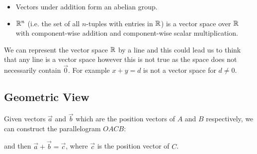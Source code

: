 \documentclass[../main.tex]{subfiles}
\begin{document}
\begin{remark}[Remarks]
  \begin{itemize}
    \item Vectors under addition form an abelian group.
    \item $\mathbb{R}^{n}$ (i.e. the set of all $n$-tuples with entries in $\mathbb{R}$) is a vector space over $\mathbb{R}$ with component-wise addition and component-wise scalar multiplication.
  \end{itemize}
\end{remark}
\begin{remark}[Warning]
  We can represent the vector space $\mathbb{R}$ by a line and this could lead us to think that any line is a vector space however this is not true as the space does not necessarily contain $\vec{0}$.
  For example $x + y = d$ is not a vector space for $d \neq 0$.
\end{remark}
\subsection{Geometric View}
Given vectors $\vec{a}$ and $\vec{b}$ which are the position vectors of $A$ and $B$ respectively, we can construct the parallelogram $OACB$:
\begin{center}
\end{center}
and then $\vec{a} + \vec{b} = \vec{c}$, where $\vec{c}$ is the position vector of $C$.
\end{document}
